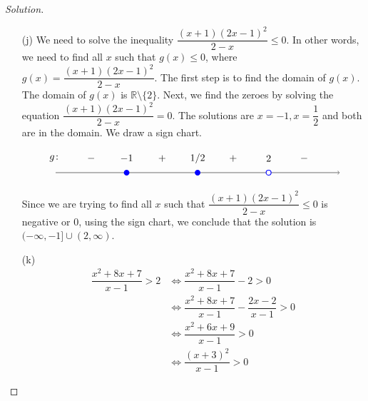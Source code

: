 \documentclass[12pt]{article}
\newenvironment{solution}{\begin{proof}[Solution]}{\end{proof}}
\begin{document}
\begin{enumerate}
\begin{solution}
\begin{itemize}
\[\begin{tikzpicture}[scale=1]
					\node at (-2, .5) {1/2};
					\node at (-4.5, .5) {$-1$};
					\node at (0.5, .5) {2};
					\node at (-7,.5) {$g\colon$};
					\node at (-3.25,.5) {$+$};
					\node at (-0.75,.5) {$+$};
					\node at (1.75, .5) {$-$};
					\node at (-5.75, .5) {$-$};
				\end{tikzpicture}
				\]		
				
				Since we are trying to find all $x$ such that $(x+1)(2x-1)^2(2-x)$ is negative, using the sign chart, we conclude that the solution is $(-\infty,-1)\cup (2,\infty)$.
				\item[(j)] 	We need to solve the inequality $\dfrac{(x+1)(2x-1)^2}{2-x}\leq 0$. In other words, we need to find all $x$ such that $g(x) \leq 0$, where $g(x)=\dfrac{(x+1)(2x-1)^2}{2-x}$. The first step is to find the domain of $g(x)$. The domain of $g(x)$ is $\mathbb{R}\setminus \{2\}$. Next, we find the zeroes by solving the equation $\dfrac{(x+1)(2x-1)^2}{2-x}=0$. The solutions are $x=-1,x=\dfrac{1}{2}$ and both are in the domain.
				We draw a sign chart. 
				
				\[
				\begin{tikzpicture}[scale=1]
					\draw[->] (-7,0) -- (3,0);
					
					\draw (-2,0) node[circle,blue,fill,inner sep=2pt]{};
					\draw (-4.5,0) node[circle,blue,fill,inner sep=2pt]{};
					\draw[blue, thick, fill=white] (0.5,0) circle (2.5pt);
					
					\node at (-2, .5) {1/2};
					\node at (-4.5, .5) {$-1$};
					\node at (0.5, .5) {2};
					\node at (-7,.5) {$g\colon$};
					\node at (-3.25,.5) {$+$};
					\node at (-0.75,.5) {$+$};
					\node at (1.75, .5) {$-$};
					\node at (-5.75, .5) {$-$};
				\end{tikzpicture}
				\]		
				
				Since we are trying to find all $x$ such that $\dfrac{(x+1)(2x-1)^2}{2-x}\leq 0$ is negative or 0, using the sign chart, we conclude that the solution is $(-\infty,-1]\cup (2,\infty)$.
				\item[(k)] 	\begin{align*}
					\dfrac{x^2+8x+7}{x-1}>2 &\iff \dfrac{x^2+8x+7}{x-1}-2>0\\
					&\iff \dfrac{x^2+8x+7}{x-1}-\dfrac{2x-2}{x-1}>0\\
					&\iff \dfrac{x^2+6x+9}{x-1}>0\\
					&\iff \dfrac{(x+3)^2}{x-1}>0					
				\end{align*}
				

\end{itemize}
\end{solution}
\end{enumerate}
\end{document}
